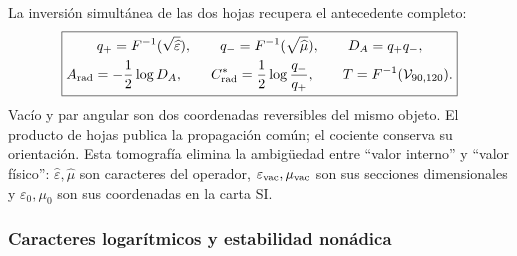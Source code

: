 La inversión simultánea de las dos hojas recupera el antecedente completo:
\begin{equation}
\boxed{
\begin{gathered}
q_+=F^{-1}(\sqrt{\widehat\varepsilon}),\qquad
q_-=F^{-1}(\sqrt{\widehat\mu}),\qquad
D_A=q_+q_-,\\
A_{\rm rad}=-\frac12\log D_A,\qquad
C^*_{\rm rad}=\frac12\log\frac{q_-}{q_+},
\qquad T=F^{-1}(\mathcal V_{90,120}).
\end{gathered}}
\label{p3-83-c31-s2:eq:vacuum-tomography}
\end{equation}
Vacío y par angular son dos coordenadas reversibles del mismo objeto. El
producto de hojas publica la propagación común; el cociente conserva su
orientación. Esta tomografía elimina la ambigüedad entre ``valor interno'' y
``valor físico'': \(\widehat\varepsilon,\widehat\mu\) son caracteres del
operador, \(\varepsilon_{\rm vac},\mu_{\rm vac}\) son sus secciones
dimensionales y \(\varepsilon_0,\mu_0\) son sus coordenadas en la carta SI.

\subsubsection{Caracteres logarítmicos y estabilidad nonádica}

